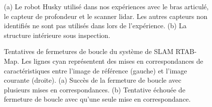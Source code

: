 \begin{figure}[htb]
\centerline{
}
	\centering
    \caption{
    (a) Le robot Husky utilisé dans nos expériences avec le bras articulé, le capteur de profondeur et le scanner lidar. Les autres capteurs non identifiés ne sont pas utilisés dans lors de l'expérience.
    (b) La structure intérieure sous inspection.}
    \label{fig:husky_exp}
\end{figure}

\begin{figure}[ht]
  \centering
  \hfil
  \caption{
    Tentatives de fermetures de boucle du système de SLAM RTAB-Map. Les lignes cyan représentent des mises en correspondances de caractéristiques entre l'image de référence (gauche) et l'image courante (droite).
    (a) Succès de la fermeture de boucle avec plusieurs mises en correspondances. (b) Tentative échouée de fermeture de boucle avec qu'une seule mise en correspondance.
  }
  \label{fig:visual_loop_closure}
\end{figure}

